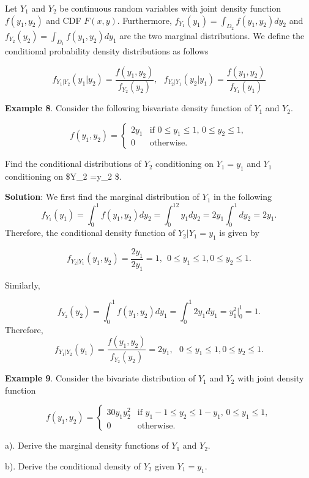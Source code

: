 \documentclass[
]{book}
\begin{document}
Let \(Y_1\) and \(Y_2\) be continuous random variables with joint density function \(f(y_1, y_2)\) and CDF \(F(x,y)\). Furthermore, \(f_{Y_1}(y_1) = \int_{D_2}f(y_1, y_2)dy_2\) and \(f_{Y_2}(y_2) = \int_{D_1}f(y_1, y_2)dy_1\) are the two marginal distributions. We define the conditional probability density distributions as follows

\[
f_{Y_1|Y_2}(y_1|y_2) = \frac{f(y_1, y_2)}{f_{Y_2}(y_2)}, \ \ \ f_{Y_2|Y_1}(y_2|y_1) = \frac{f(y_1, y_2)}{f_{Y_1}(y_1)}
\]

\hfill\break

\textbf{Example 8}. Consider the following bisvariate density function of \(Y_1\) and \(Y_2\).

\[
\displaystyle f(y_1, y_2) = \begin{cases} 
 2y_1 & \text{if $0 \le y_1 \le 1$, $0 \le y_2 \le 1$}, \\  
 0 & \text{otherwise}.
 \end{cases}
\]

Find the conditional distributions of \(Y_2\) conditioning on \(Y_1=y_1\) and \(Y_1\) conditioning on \$Y\_2 =y\_2 \$.

\textbf{Solution}: We first find the marginal distribution of \(Y_1\) in the following
\[
f_{Y_1}(y_1) = \int_0^1f(y_1, y_2)dy_2=\int_0^12y_1dy_2 = 2y_1\int_0^1dy_2=2y_1.
\]
Therefore, the conditional density function of \(Y_2|Y_1=y_1\) is given by

\[
f_{Y_2|Y_1}(y_1,y_2) = \frac{2y_1}{2y_1} = 1, \ \ 0 \le y_1 \le 1, 0 \le y_2 \le 1.
\]

Similarly,

\[
f_{Y_2}(y_2) = \int_0^1f(y_1, y_2)dy_1 = \int_0^1 2y_1dy_1 = y_1^2\Big|_0^1 = 1.
\]
Therefore,
\[
f_{Y_1|Y_2}(y_1) = \frac{f(y_1,y_2)}{f_{Y_2}(y_2)} = 2y_1, \ \ \ 0 \le y_1 \le 1, 0 \le y_2 \le 1.
\]

\hfill\break

\textbf{Example 9}. Consider the bivariate distribution of \(Y_1\) and \(Y_2\) with joint density function

\[
\displaystyle f(y_1, y_2) = \begin{cases} 
 30y_1y_2^2 & \text{if $y_1-1 \le y_2 \le 1- y_1$, $0 \le y_1 \le 1$}, \\  
 0 & \text{otherwise}.
 \end{cases}
\]

a). Derive the marginal density functions of \(Y_1\) and \(Y_2\).

b). Derive the conditional density of \(Y_2\) given \(Y_1 = y_1\).
\end{document}
